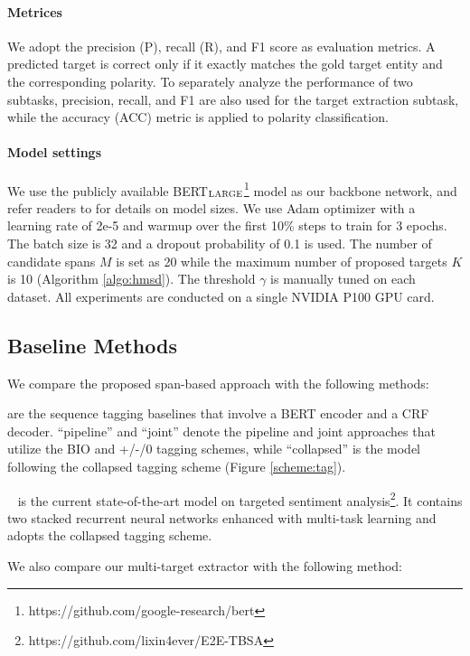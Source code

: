 \documentclass[11pt,a4paper]{article}
\newcommand\bertlarge{BERT$_{\textsc{LARGE}}$\xspace}
\begin{document}
\paragraph{Metrices}
We adopt the precision (P), recall (R), and F1 score as evaluation metrics. 
A predicted target is correct only if it exactly matches the gold target entity and the corresponding polarity.
To separately analyze the performance of two subtasks, precision, recall, and F1 are also used for the target extraction subtask, while the accuracy (ACC) metric is applied to polarity classification.

\paragraph{Model settings}
We use the publicly available \bertlarge\footnote{https://github.com/google-research/bert} model as our backbone network, and refer readers to \citet{devlin2018bert} for details on model sizes.
We use Adam optimizer with a learning rate of 2e-5 and warmup over the first 10\% steps to train for 3 epochs.
The batch size is 32 and a dropout probability of 0.1 is used.
The number of candidate spans $M$ is set as 20 while the maximum number of proposed targets $K$ is 10 (Algorithm \ref{algo:hmsd}).
The threshold $\gamma$ is manually tuned on each dataset.
All experiments are conducted on a single NVIDIA P100 GPU card.


\subsection{Baseline Methods}
We compare the proposed span-based approach with the following methods:

 are the sequence tagging baselines that involve a BERT encoder and a CRF decoder. ``pipeline'' and ``joint'' denote the pipeline and joint approaches that utilize the BIO and +/-/0 tagging schemes, while ``collapsed'' is the model following the collapsed tagging scheme (Figure \ref{scheme:tag}).

~\cite{li2018unified} is the current state-of-the-art model on targeted sentiment analysis\footnote{https://github.com/lixin4ever/E2E-TBSA}. It contains two stacked recurrent neural networks enhanced with multi-task learning and adopts the collapsed tagging scheme.

We also compare our multi-target extractor with the following method:
\end{document}
